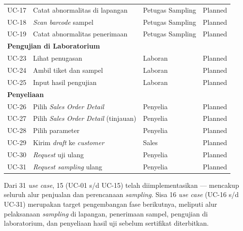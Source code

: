 \begin{table}[h]
\begin{tabular}{|l|p{6.5cm}|p{3cm}|l|}
UC-17 & Catat abnormalitas di lapangan & Petugas Sampling & Planned \\
UC-18 & \textit{Scan barcode} sampel & Petugas Sampling & Planned \\
UC-19 & Catat abnormalitas penerimaan & Petugas Sampling & Planned \\
\hline
\multicolumn{4}{|l|}{\textbf{Pengujian di Laboratorium}} \\
\hline
UC-23 & Lihat penugasan & Laboran & Planned \\
UC-24 & Ambil tiket dan sampel & Laboran & Planned \\
UC-25 & Input hasil pengujian & Laboran & Planned \\
\hline
\multicolumn{4}{|l|}{\textbf{Penyeliaan}} \\
\hline
UC-26 & Pilih \textit{Sales Order Detail} & Penyelia & Planned \\
UC-27 & Pilih \textit{Sales Order Detail} (tinjauan) & Penyelia & Planned \\
UC-28 & Pilih parameter & Penyelia & Planned \\
UC-29 & Kirim \textit{draft} ke \textit{customer} & Sales & Planned \\
UC-30 & \textit{Request} uji ulang & Penyelia & Planned \\
UC-31 & \textit{Request sampling} ulang & Penyelia & Planned \\
\hline
\end{tabular}
\end{table}

Dari 31 \textit{use case}, 15 (UC-01 s/d UC-15) telah diimplementasikan — mencakup seluruh alur penjualan dan perencanaan \textit{sampling}. Sisa 16 \textit{use case} (UC-16 s/d UC-31) merupakan target pengembangan fase berikutnya, meliputi alur pelaksanaan \textit{sampling} di lapangan, penerimaan sampel, pengujian di laboratorium, dan penyeliaan hasil uji sebelum sertifikat diterbitkan.
